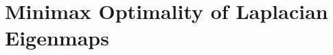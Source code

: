 \documentclass{article}
\newcommand{\Reals}{\mathbb{R}}
\newcommand{\1}{\mathbf{1}}
\newcommand{\Rd}{\Reals^d}
\newcommand{\Xset}{\mathcal{X}}
\newcommand{\mc}[1]{\mathcal{#1}}
\newcommand{\wh}[1]{\widehat{#1}}
\theoremstyle{alden}
\theoremstyle{aldenthm}
\theoremstyle{definition}
\theoremstyle{remark}
\begin{document}

\section{Minimax Optimality of Laplacian Eigenmaps}
\label{sec:minimax_optimal_laplacian_eigenmaps}
\end{document}
